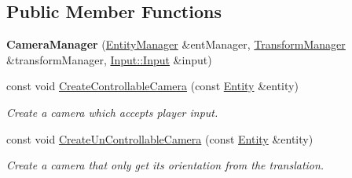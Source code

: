 \subsection*{Public Member Functions}
\begin{DoxyCompactItemize}
\item 
{\bfseries Camera\+Manager} (\hyperlink{class_ensum_1_1_components_1_1_entity_manager}{Entity\+Manager} \&ent\+Manager, \hyperlink{class_ensum_1_1_components_1_1_transform_manager}{Transform\+Manager} \&transform\+Manager, \hyperlink{class_ensum_1_1_input_1_1_input}{Input\+::\+Input} \&input)\hypertarget{class_ensum_1_1_components_1_1_camera_manager_ac7b03cc416c4cd3eb033356c2c49d4c1}{}\label{class_ensum_1_1_components_1_1_camera_manager_ac7b03cc416c4cd3eb033356c2c49d4c1}

\item 
const void \hyperlink{class_ensum_1_1_components_1_1_camera_manager_a47e425d0c9ec790f6e54f813c601d28b}{Create\+Controllable\+Camera} (const \hyperlink{struct_ensum_1_1_components_1_1_entity}{Entity} \&entity)
\begin{DoxyCompactList}\small\item\em Create a camera which accepts player input. \end{DoxyCompactList}\item 
const void \hyperlink{class_ensum_1_1_components_1_1_camera_manager_a7e18a054f3dff83b2766df1d79093026}{Create\+Un\+Controllable\+Camera} (const \hyperlink{struct_ensum_1_1_components_1_1_entity}{Entity} \&entity)
\begin{DoxyCompactList}\small\item\em Create a camera that only get its orientation from the translation. \end{DoxyCompactList}\end{DoxyCompactItemize}

